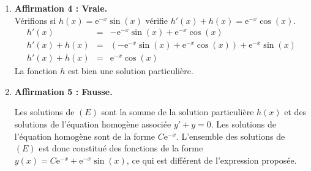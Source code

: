 \documentclass[10pt]{article}
\begin{document}
\begin{enumerate}
\item \textbf{Affirmation 4 : Vraie.} \\
Vérifions si $h(x) = \mathrm{e}^{-x}\sin(x)$ vérifie $h'(x) + h(x) = \mathrm{e}^{-x} \cos(x)$.
\[
\begin{array}{rcl}
h'(x) &=& -\mathrm{e}^{-x}\sin(x) + \mathrm{e}^{-x}\cos(x) \\
h'(x) + h(x) &=& \left( -\mathrm{e}^{-x}\sin(x) + \mathrm{e}^{-x}\cos(x) \right) + \mathrm{e}^{-x}\sin(x) \\
h'(x) + h(x) &=& \mathrm{e}^{-x}\cos(x)
\end{array}
\]
La fonction $h$ est bien une solution particulière.

\item \textbf{Affirmation 5 : Fausse.} 

Les solutions de $(E)$ sont la somme de la solution particulière $h(x)$ et des solutions de l'équation homogène associée $y' + y = 0$.
Les solutions de l'équation homogène sont de la forme $C\mathrm{e}^{-x}$. 
L'ensemble des solutions de $(E)$ est donc constitué des fonctions de la forme $y(x) = C\mathrm{e}^{-x} + \mathrm{e}^{-x}\sin(x)$, ce qui est différent de l'expression proposée.
\end{enumerate}
\label{LastPage}
\end{document}
